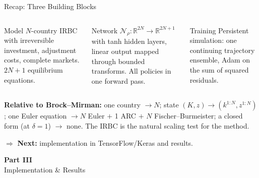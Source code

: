 \documentclass[aspectratio=169,11pt]{beamer}
\newcommand{\emphc}[1]{\textcolor{harvardcrimson}{#1}}
\newcommand{\R}{\mathbb{R}}
\begin{document}
\begin{frame}{Recap: Three Building Blocks}
\begin{columns}[T]
\begin{block}{Model}
\centering
\small
$N$-country IRBC with irreversible investment, adjustment costs, complete markets. $2N+1$ equilibrium equations.
\end{block}

\begin{block}{Network}
\centering
\small
$\mathcal{N}_\rho: \R^{2N} \to \R^{2N+1}$ with tanh hidden layers, linear output mapped through bounded transforms. All policies in one forward pass.
\end{block}

\begin{block}{Training}
\centering
\small
Persistent simulation: one continuing trajectory ensemble, Adam on the sum of squared residuals.
\end{block}
\end{columns}

\vspace{0.5em}
{\small \textbf{Relative to Brock--Mirman:} one country $\to N$; state $(K,z)\to(k^{1:N},z^{1:N})$;
one Euler equation $\to N$ Euler $+$ 1 ARC $+$ $N$ Fischer--Burmeister; a closed form (at $\delta=1$)
$\to$ none. The IRBC is the natural \emphc{scaling test} for the method.}

\vspace{0.4em}
\begin{center}
$\Rightarrow$ \textbf{Next:} implementation in TensorFlow/Keras and results.
\end{center}
\end{frame}


\begin{frame}{}
\vfill
\begin{center}
{\Huge \textcolor{uzhblue}{\textbf{Part III}}}\\[12pt]
{\LARGE Implementation \& Results}
\end{center}
\vfill
\end{frame}
\end{document}
